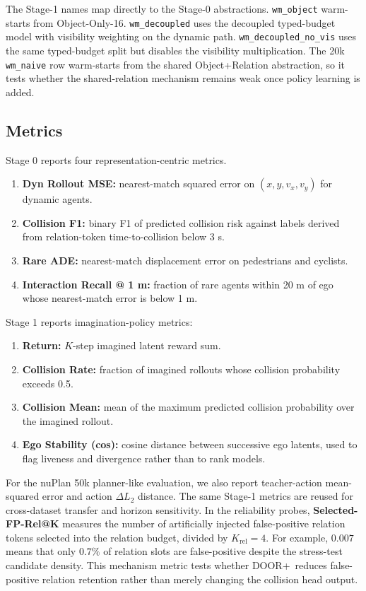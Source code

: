 \documentclass[10pt,journal,compsoc]{IEEEtran}
\newcommand{\doorplus}{\textsc{DOOR+}}
\begin{document}
The Stage-1 names map directly to the Stage-0 abstractions. \texttt{wm\_object} warm-starts from Object-Only-16. \texttt{wm\_decoupled} uses the decoupled typed-budget model with visibility weighting on the dynamic path. \texttt{wm\_decoupled\_no\_vis} uses the same typed-budget split but disables the visibility multiplication. The 20k \texttt{wm\_naive} row warm-starts from the shared Object+Relation abstraction, so it tests whether the shared-relation mechanism remains weak once policy learning is added.

\subsection{Metrics}
Stage 0 reports four representation-centric metrics.
\begin{enumerate}
\item \textbf{Dyn Rollout MSE:} nearest-match squared error on $(x,y,v_x,v_y)$ for dynamic agents.
\item \textbf{Collision F1:} binary F1 of predicted collision risk against labels derived from relation-token time-to-collision below 3 s.
\item \textbf{Rare ADE:} nearest-match displacement error on pedestrians and cyclists.
\item \textbf{Interaction Recall @ 1 m:} fraction of rare agents within 20 m of ego whose nearest-match error is below 1 m.
\end{enumerate}
Stage 1 reports imagination-policy metrics:
\begin{enumerate}
\item \textbf{Return:} $K$-step imagined latent reward sum.
\item \textbf{Collision Rate:} fraction of imagined rollouts whose collision probability exceeds 0.5.
\item \textbf{Collision Mean:} mean of the maximum predicted collision probability over the imagined rollout.
\item \textbf{Ego Stability (cos):} cosine distance between successive ego latents, used to flag liveness and divergence rather than to rank models.
\end{enumerate}
For the nuPlan 50k planner-like evaluation, we also report teacher-action mean-squared error and action $\Delta L_2$ distance. The same Stage-1 metrics are reused for cross-dataset transfer and horizon sensitivity. In the reliability probes, \textbf{Selected-FP-Rel@K} measures the number of artificially injected false-positive relation tokens selected into the relation budget, divided by $K_{\mathrm{rel}}=4$. For example, $0.007$ means that only $0.7\%$ of relation slots are false-positive despite the stress-test candidate density. This mechanism metric tests whether \doorplus\ reduces false-positive relation retention rather than merely changing the collision head output.
\end{document}
